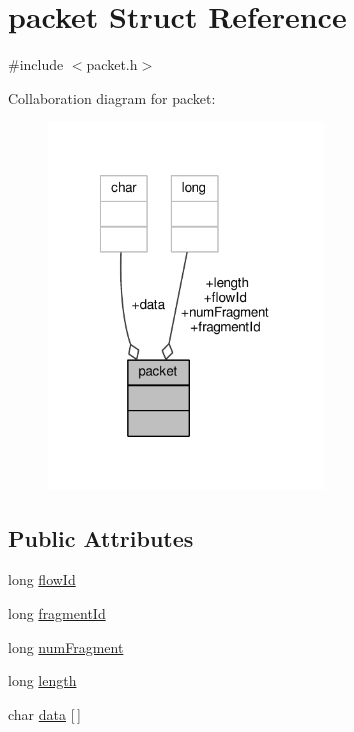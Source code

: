 \hypertarget{structpacket}{\section{packet Struct Reference}
\label{structpacket}
}


{\ttfamily \#include $<$packet.\-h$>$}



Collaboration diagram for packet\-:
\nopagebreak
\begin{figure}[H]
\begin{center}
\leavevmode
\includegraphics[width=207pt]{structpacket__coll__graph}
\end{center}
\end{figure}
\subsection*{Public Attributes}
\begin{DoxyCompactItemize}
\item 
long \hyperlink{structpacket_af879fccc0e322659503bf8cde85a3913}{flow\-Id}
\item 
long \hyperlink{structpacket_a83b2ee6e849aa55c866c280700107f5c}{fragment\-Id}
\item 
long \hyperlink{structpacket_a38c53edee9d6c5510cbc992e0aa6b02d}{num\-Fragment}
\item 
long \hyperlink{structpacket_af19726c77735c35579195c883a0afab5}{length}
\item 
char \hyperlink{structpacket_abc317d41c02fc51bcdd9b6192f0b0f08}{data} \mbox{[}$\,$\mbox{]}
\end{DoxyCompactItemize}


